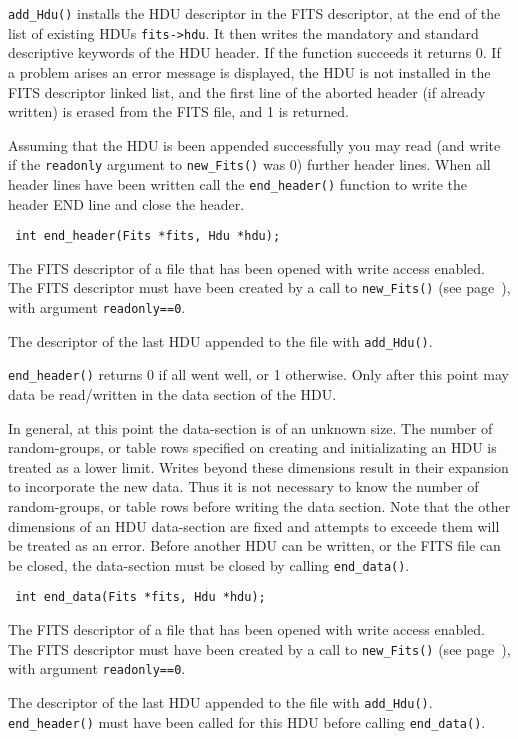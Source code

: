 \verb`add_Hdu()` installs the HDU descriptor in the FITS descriptor, at
the end of the list of existing HDUs \verb`fits->hdu`. It then writes
the mandatory and standard descriptive keywords of the HDU header.
If the function succeeds it returns 0. If a problem arises an error
message is displayed, the HDU is not installed in the FITS descriptor
linked list, and the first line of the aborted header (if already
written) is erased from the FITS file, and 1 is returned.

Assuming that the HDU is been appended successfully you may read (and
write if the \verb`readonly` argument to \verb`new_Fits()` was 0)
further header lines. When all header lines have been written call the
\verb`end_header()` function to write the header END line and close
the header.

\label{end_header}\begin{verbatim}
 int end_header(Fits *fits, Hdu *hdu);
\end{verbatim}
\begin{arglist}

 The FITS descriptor of a file that has been opened with
             write access enabled. The FITS descriptor must have been
             created by a call to \verb`new_Fits()`
             (see page~\pageref{new_Fits}), with argument
             \verb`readonly==0`. 

 The descriptor of the last HDU appended to the file with
            \verb`add_Hdu()`.
\end{arglist}

\verb`end_header()` returns 0 if all went well, or 1 otherwise. Only
after this point may data be read/written in the data section of the
HDU.

In general, at this point the data-section is of an unknown size. The
number of random-groups, or table rows specified on creating and
initializating an HDU is treated as a lower limit. Writes beyond these
dimensions result in their expansion to incorporate the new data. Thus
it is not necessary to know the number of random-groups, or table rows
before writing the data section. Note that the other dimensions of an
HDU data-section are fixed and attempts to exceede them will be
treated as an error. Before another HDU can be written, or the FITS
file can be closed, the data-section must be closed by calling
\verb`end_data()`. 

\label{end_data}\begin{verbatim}
 int end_data(Fits *fits, Hdu *hdu);
\end{verbatim}
\begin{arglist}

 The FITS descriptor of a file that has been opened with
             write access enabled. The FITS descriptor must have been
             created by a call to \verb`new_Fits()`
             (see page~\pageref{new_Fits}), with argument
             \verb`readonly==0`. 

 The descriptor of the last HDU appended to the file with
            \verb`add_Hdu()`. \verb`end_header()` must have been
            called for this HDU before calling \verb`end_data()`.
\end{arglist}

